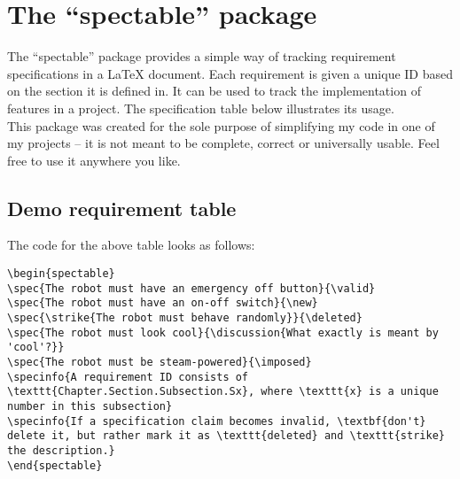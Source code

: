\documentclass[12pt,a4paper]{scrreprt}
\begin{document}
\pagestyle{empty}

\chapter{The ``spectable'' package}

The ``spectable'' package provides a simple way of tracking requirement specifications in a LaTeX document. Each requirement is given a unique ID based on the section it is defined in. It can be used to track the implementation of features in a project. The specification table below illustrates its usage.\\

This package was created for the sole purpose of simplifying my code in one of my projects -- it is not meant to be complete, correct or universally usable. Feel free to use it anywhere you like.

\section{Demo requirement table}

\begin{spectable}
\end{spectable}

The code for the above table looks as follows:
\begin{verbatim}
\begin{spectable}
\spec{The robot must have an emergency off button}{\valid}
\spec{The robot must have an on-off switch}{\new}
\spec{\strike{The robot must behave randomly}}{\deleted}
\spec{The robot must look cool}{\discussion{What exactly is meant by 'cool'?}}
\spec{The robot must be steam-powered}{\imposed}
\specinfo{A requirement ID consists of \texttt{Chapter.Section.Subsection.Sx}, where \texttt{x} is a unique number in this subsection}
\specinfo{If a specification claim becomes invalid, \textbf{don't} delete it, but rather mark it as \texttt{deleted} and \texttt{strike} the description.}
\end{spectable}
\end{verbatim}
\end{document}
